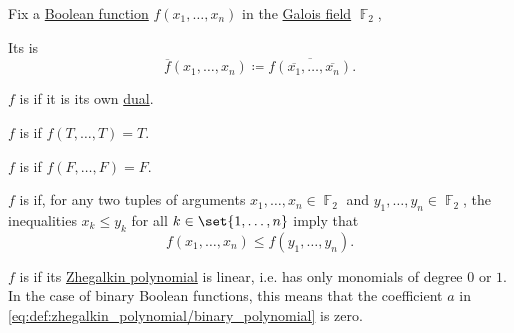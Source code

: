 \begin{definition}\label{def:boolean_functions_in_f2}
  Fix a \hyperref[def:boolean_function]{Boolean function} \( f(x_1, \ldots, x_n) \) in the \hyperref[thm:galois_field_existence]{Galois field} \( \BbbF_2 \),

  \begin{thmenum}
     Its  is
    \begin{equation*}
      \overline{f}(x_1, \ldots, x_n) \coloneqq \overline{f(\overline{x_1}, \ldots, \overline{x_n})}.
    \end{equation*}

     \( f \) is  if it is its own \hyperref[def:boolean_function_in_f2/dual]{dual}.

     \( f \) is  if \( f(T, \ldots, T) = T \).

     \( f \) is  if \( f(F, \ldots, F) = F \).

     \( f \) is  if, for any two tuples of arguments \( x_1, \ldots, x_n \in \BbbF_2 \) and \( y_1, \ldots, y_n \in \BbbF_2 \), the inequalities \( x_k \leq y_k \) for all \( k \in \set{ 1, \ldots, n } \) imply that
    \begin{equation*}
      f(x_1, \ldots, x_n) \leq f(y_1, \ldots, y_n).
    \end{equation*}

     \( f \) is  if its \hyperref[def:zhegalkin_polynomial]{Zhegalkin polynomial} is linear, i.e. has only monomials of degree \( 0 \) or \( 1 \). In the case of binary Boolean functions, this means that the coefficient \( a \) in \eqref{eq:def:zhegalkin_polynomial/binary_polynomial} is zero.
  \end{thmenum}
\end{definition}

